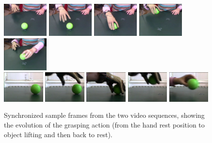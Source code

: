 \documentclass{article}
\begin{document}
\begin{figure}[!ht]
	\centering
	\includegraphics[height=1.75cm]{images/frontal1}
	\includegraphics[height=1.75cm]{images/frontal2}
	\includegraphics[height=1.75cm]{images/frontal3}
	\includegraphics[height=1.75cm]{images/frontal4}
	\includegraphics[height=1.75cm]{images/frontal5}\\
	\vskip 0.1cm
	\includegraphics[width=0.19\textwidth]{images/side1}
	\includegraphics[width=0.19\textwidth]{images/side2}
	\includegraphics[width=0.19\textwidth]{images/side3}
	\includegraphics[width=0.19\textwidth]{images/side4}
	\includegraphics[width=0.19\textwidth]{images/side5}
	\caption{Synchronized sample frames from the two video sequences, showing
	  the evolution of the grasping action (from the hand rest position to
	  object lifting and then back to rest). }
	\label{fig::grasp_sequence}
\end{figure}
\end{document}

